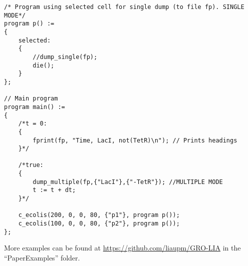 \documentclass[10pt,a4paper]{article}
\begin{document}
\newpage
\begin{Verbatim}[obeytabs]
/* Program using selected cell for single dump (to file fp). SINGLE
MODE*/
program p() :=
{
	selected:
	{
		//dump_single(fp);
		die();
	}
};

// Main program
program main() :=
{
	/*t = 0: 
	{
		fprint(fp, "Time, LacI, not(TetR)\n"); // Prints headings
	}*/
	
	/*true:
	{
		dump_multiple(fp,{"LacI"},{"-TetR"}); //MULTIPLE MODE
		t := t + dt;
	}*/
	
	c_ecolis(200, 0, 0, 80, {"p1"}, program p());
	c_ecolis(100, 0, 0, 80, {"p2"}, program p());
};
\end{Verbatim}

More examples can be found at \href{https://github.com/liaupm/GRO-LIA}{https://github.com/liaupm/GRO-LIA}  in the “PaperExamples” folder.
\end{document}
